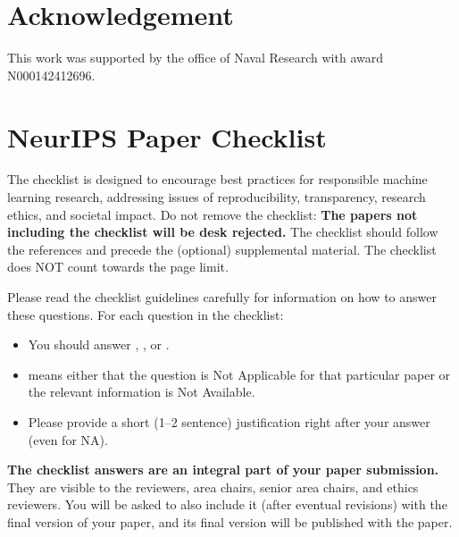 \documentclass{article}
\begin{document}
\section*{Acknowledgement}
This work was supported by the office of Naval Research with award N000142412696.


{\small
	
	
}


\newpage
\section*{NeurIPS Paper Checklist}

\iffalse
The checklist is designed to encourage best practices for responsible machine learning research, addressing issues of reproducibility, transparency, research ethics, and societal impact. Do not remove the checklist: {\bf The papers not including the checklist will be desk rejected.} The checklist should follow the references and precede the (optional) supplemental material.  The checklist does NOT count towards the page
limit. 

Please read the checklist guidelines carefully for information on how to answer these questions. For each question in the checklist:
\begin{itemize}
    \item You should answer \answerYes{}, \answerNo{}, or \answerNA{}.
    \item \answerNA{} means either that the question is Not Applicable for that particular paper or the relevant information is Not Available.
    \item Please provide a short (1–2 sentence) justification right after your answer (even for NA). 
\end{itemize}

{\bf The checklist answers are an integral part of your paper submission.} They are visible to the reviewers, area chairs, senior area chairs, and ethics reviewers. You will be asked to also include it (after eventual revisions) with the final version of your paper, and its final version will be published with the paper.
\end{document}
